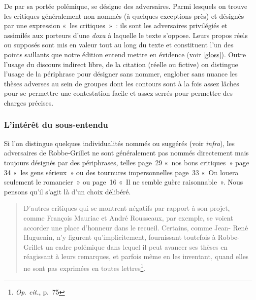 \documentclass[12pt, a4paper]{article}
\begin{document}

De par sa portée polémique, \punr{} se désigne des adversaires. Parmi lesquels on trouve les critiques généralement non nommés (à quelques exceptions près) et désignés par une expression «~les critiques~»~: ils sont les adversaires privilégiés et assimilés aux porteurs d'une \textit{doxa} à laquelle le texte s'oppose. Leurs propos réels ou supposés sont mis en valeur tout au long du texte et constituent l'un des points saillants que notre édition entend mettre en évidence (voir \ref{gloss}). Outre l'usage du discours indirect libre, de la citation (réelle ou fictive) on distingue l'usage de la périphrase pour désigner sans nommer, englober sans nuance les thèses adverses au sein de groupes dont les contours sont à la fois assez lâches pour se permettre une contestation facile et assez serrés pour permettre des charges précises.


\subsubsection{L'intérêt du sous-entendu}
Si l'on distingue quelques individualités nommés ou suggérés (voir \textit{infra}), les adversaires de Robbe-Grillet ne sont généralement pas nommés directement mais toujours désignés par des périphrases, telles page~29 «~nos bons critiques~» page 34 «~les gens sérieux~» ou des tournures impersonnelles page~33 «~On louera seulement le romancier~» ou page~16 «~Il ne semble guère raisonnable~». Nous pensons qu'il s'agit là d'un choix délibéré.

\begin{quote}
    D'autres critiques qui se montrent négatifs par rapport à son projet,
comme François Mauriac et André Rousseaux, par exemple, se voient
accorder une place d’honneur dans le recueil. Certains, comme Jean-
René Huguenin, n’y figurent qu’implicitement, fournissant toutefois à
Robbe-Grillet un cadre polémique dans lequel il peut avancer ses
thèses en réagissant à leurs remarques, et parfois même en les inventant,
quand elles ne sont pas exprimées en toutes lettres\footnote{\textit{Op. cit.}, p.~75}.
\end{quote}
\end{document}

